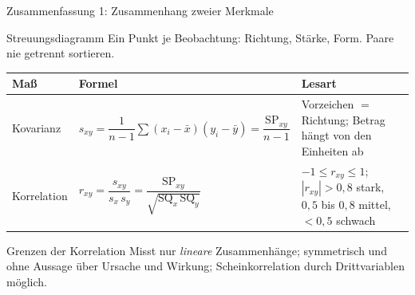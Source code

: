 \documentclass[aspectratio=169,11pt]{beamer}
\newcommand{\SQx}{\text{SQ}_x}
\newcommand{\SQy}{\text{SQ}_y}
\newcommand{\SPxy}{\text{SP}_{xy}}
\begin{document}
\begin{frame}{Zusammenfassung 1: Zusammenhang zweier Merkmale}
  \begin{block}{Streuungsdiagramm}
    Ein Punkt je Beobachtung: Richtung, Stärke, Form. Paare nie getrennt sortieren.
  \end{block}

  \begin{center}
    \small
    \renewcommand{\arraystretch}{1.3}
    \begin{tabular}{@{}l l L{5.3cm}@{}}
      \toprule
      \textbf{Maß} & \textbf{Formel} & \textbf{Lesart} \\
      \midrule
      Kovarianz   & $s_{xy} = \dfrac{1}{n-1}\sum (x_i-\bar{x})(y_i-\bar{y}) = \dfrac{\SPxy}{n-1}$
                  & Vorzeichen $=$ Richtung; Betrag hängt von den Einheiten ab \\
      Korrelation & $r_{xy} = \dfrac{s_{xy}}{s_x\,s_y} = \dfrac{\SPxy}{\sqrt{\SQx\,\SQy}}$
                  & $-1 \le r_{xy} \le 1$; \ $|r_{xy}| > 0{,}8$ stark,
                    $0{,}5$ bis $0{,}8$ mittel, $< 0{,}5$ schwach \\
      \bottomrule
    \end{tabular}
  \end{center}

  \begin{alertblock}{Grenzen der Korrelation}
    Misst nur \emph{lineare} Zusammenhänge; symmetrisch und ohne Aussage über
    Ursache und Wirkung; Scheinkorrelation durch Drittvariablen möglich.
  \end{alertblock}
\end{frame}
\end{document}
